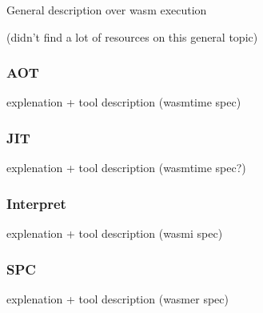 \documentclass[../main.tex]{subfiles}
\begin{document}
General description over wasm execution

(didn't find a lot of resources on this general topic)

\subsubsection{AOT}
explenation + tool description (wasmtime spec)
\subsubsection{JIT}
explenation + tool description (wasmtime spec?)
\subsubsection{Interpret}
explenation + tool description (wasmi spec)
\subsubsection{SPC} %
explenation + tool description (wasmer spec)
\end{document}

